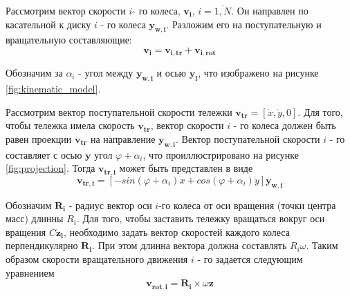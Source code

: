 \documentclass[oneside,final,14pt]{extreport}
\newcommand{\bs}{\boldsymbol}
\begin{document}
Рассмотрим вектор скорости $i$- го колеса, $\bs{v_{i}}$, $i = \overline{1,N}$. Он направлен по касательной к диску $i$ - го колеса $\bs{y_{w,i}}$. Разложим его на поступательную и  вращательную составляющие:
\begin{equation}
\bs{v_{i}}
=
\bs{v_{i,tr}}
+
\bs{v_{i,rot}}
\end{equation}

Обозначим за $\alpha_{i}$ - угол между $\bs{y_{w,i}}$ и осью $\bs{y_{l}}$, что изображено на рисунке \ref{fig:kinematic_model}. 




Рассмотрим вектор поступательной скорости тележки $\bs{v_{tr}}=[\dot{x},\dot{y},0]$. Для того, чтобы тележка имела скорость $\bs{v_{tr}}$, вектор скорости $i$ - го колеса должен быть равен проекции $\bs{v_{tr}}$ на направление $\bs{y_{w,i}}$. Вектор поступательной скорости $i$ - го составляет с осью $\bs{y}$  угол $\varphi + \alpha_{i}$, что проиллюстрировано на рисунке \ref{fig:projection}. Тогда $\bs{v_{tr,i}}$ может быть представлен в виде
\begin{equation}
\label{eq:v_rt_i_global}
\bs{v_{tr,i}} 
=
[
-sin(\varphi +\alpha_{i})
\dot{x}
+
cos(\varphi +\alpha_{i})
\dot{y}
]
\bs{y_{w,i}}
\end{equation} 



\begin{figure}[H]
\end{figure} 

Обозначим $\bs{R_{i}}$ - радиус вектор оси $i$-го колеса от оси вращения  (точки центра масс) длинны $R_{i}$. Для того, чтобы заставить тележку вращаться вокруг оси вращения $C\bs{z_{l}}$, необходимо задать вектор скоростей каждого колеса перпендикулярно $\bs{R_{i}}$. При этом длинна вектора должна составлять $R_{i}\omega$.
Таким образом скорости вращательного движения $i$ - го задается следующим уравнением
\begin{equation}
\bs{v_{rot,i}}
=
\bs{R_{i}}
\times
\omega
\bs{z}
\end{equation}

\begin{figure}[H]
\end{figure}
\end{document}
